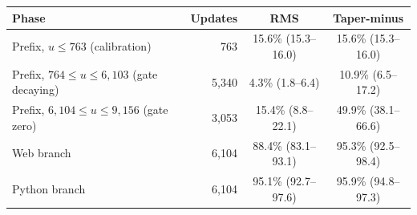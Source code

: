 \begin{tabular}{@{}lrcc@{}}
\toprule
Phase & Updates & RMS & Taper-minus \\
\midrule
Prefix, $u \le 763$ (calibration) & 763 & 15.6\% (15.3--16.0) & 15.6\% (15.3--16.0) \\
Prefix, $764 \le u \le 6{,}103$ (gate decaying) & 5{,}340 & 4.3\% (1.8--6.4) & 10.9\% (6.5--17.2) \\
Prefix, $6{,}104 \le u \le 9{,}156$ (gate zero) & 3{,}053 & 15.4\% (8.8--22.1) & 49.9\% (38.1--66.6) \\
Web branch & 6{,}104 & 88.4\% (83.1--93.1) & 95.3\% (92.5--98.4) \\
Python branch & 6{,}104 & 95.1\% (92.7--97.6) & 95.9\% (94.8--97.3) \\
\bottomrule
\end{tabular}
